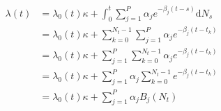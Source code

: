 \documentclass{article}
\newcommand{\mathd}{\mathrm{d}}
\begin{document}
$\begin{array}{ll}
  \lambda ( t) & = \lambda_0 ( t) \kappa + \int_0^t \sum_{j = 1}^P \alpha_j
  e^{- \beta_j ( t - s)} \mathd N_s\\
  & = \lambda_0 ( t) \kappa + \sum_{k = 0}^{N_t - 1} \sum_{j = 1}^P \alpha_j
  e^{- \beta_j ( t - t_k)}\\
  & = \lambda_0 ( t) \kappa + \sum_{j = 1}^P \sum_{k = 0}^{N_t - 1} \alpha_j
  e^{- \beta_j ( t - t_k)}\\
  & = \lambda_0 ( t) \kappa + \sum_{j = 1}^P \alpha_j \sum_{k = 0}^{N_t - 1}
  e^{- \beta_j ( t - t_k)}\\
  & = \lambda_0 ( t) \kappa + \sum_{j = 1}^P \alpha_j B_j ( N_t)
\end{array}$
\end{document}
